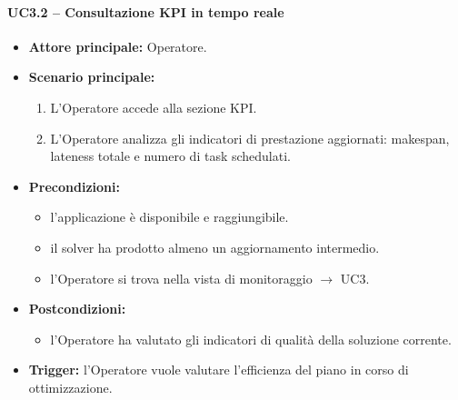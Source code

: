 \paragraph{UC3.2 -- Consultazione KPI in tempo reale}
\begin{itemize}
    \item \textbf{Attore principale:} Operatore.
    \item \textbf{Scenario principale:}
    \begin{enumerate}
        \item L'Operatore accede alla sezione KPI.
        \item L'Operatore analizza gli indicatori di prestazione aggiornati: \gls{makespan}, \gls{lateness} totale e numero di task schedulati.
    \end{enumerate}
    \item \textbf{Precondizioni:}
    \begin{itemize}
        \item l'applicazione è disponibile e raggiungibile.
        \item il solver ha prodotto almeno un aggiornamento intermedio.
        \item l'Operatore si trova nella vista di monitoraggio $\rightarrow$ UC3.
    \end{itemize}
    \item \textbf{Postcondizioni:}
    \begin{itemize}
        \item l'Operatore ha valutato gli indicatori di qualità della soluzione corrente.
    \end{itemize}
    \item \textbf{Trigger:} l'Operatore vuole valutare l'efficienza del piano in corso di ottimizzazione.
\end{itemize}

